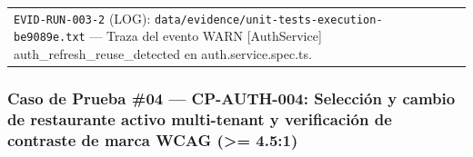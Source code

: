 \documentclass[10pt,a4paper]{article}
\begin{document}
{\begin{longtable}[]{@{}
  >{\raggedright\arraybackslash}p{}
  >{\raggedright\arraybackslash}p{}@{}}
\begin{minipage}[t]{\linewidth}
\texttt{EVID-{}\allowbreak{}RUN-{}\allowbreak{}003-{}\allowbreak{}2} (LOG): \texttt{data/\allowbreak{}evidence/\allowbreak{}unit-{}\allowbreak{}tests-{}\allowbreak{}execution-{}\allowbreak{}be9089e.\allowbreak{}txt} --- Traza del evento WARN {[}AuthService{]} auth\_refresh\_reuse\_detected en auth.service.spec.ts.\strut
\end{minipage} \\
\end{longtable}
}

\endgroup\medskip


\subsubsection{Caso de Prueba \#04 --- CP-AUTH-004: Selección y cambio de restaurante activo multi-tenant y verificación de contraste de marca WCAG (\textgreater= 4.5:1)}\label{caso-de-prueba-04--cp-auth-004-selecciuxf3n-y-cambio-de-restaurante-activo-multi-tenant-y-verificaciuxf3n-de-contraste-de-marca-wcag--451}

\begingroup\singlespacing\footnotesize\setlength{\parskip}{0pt}
\end{document}
